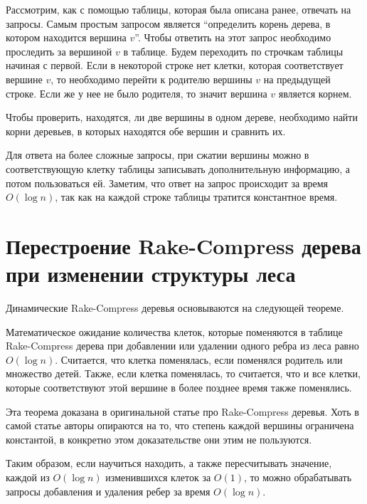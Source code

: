 Рассмотрим, как с помощью таблицы, которая была описана ранее, отвечать на запросы. Самым простым запросом является ``определить корень дерева, в котором находится вершина $v$''.
Чтобы ответить на этот запрос необходимо проследить за вершиной $v$ в таблице. Будем переходить по строчкам таблицы начиная с первой. Если в некоторой строке нет клетки,
которая соответствует вершине $v$, то необходимо перейти к родителю вершины $v$ на предыдущей строке. Если же у нее не было родителя, то значит вершина $v$ является корнем.

Чтобы проверить, находятся, ли две вершины в одном дереве, необходимо найти корни деревьев, в которых находятся обе вершин и сравнить их.

Для ответа на более сложные запросы, при сжатии вершины можно в соответствующую клетку таблицы записывать дополнительную информацию, а потом пользоваться ей. 
Заметим, что ответ на запрос происходит за время $O(\log n)$, так как на каждой строке таблицы тратится константное время.


\FloatBarrier
\section{Перестроение Rake-Compress дерева при изменении структуры леса}

Динамические Rake-Compress деревья основываются на следующей теореме.                                          

\begin{theorem}
Математическое ожидание количества клеток, которые поменяются в таблице Rake-Compress дерева при добавлении или удалении одного ребра из леса равно $O(\log n)$. 
Считается, что клетка поменялась, если поменялся родитель или множество детей.
Также, если клетка поменялась, то считается, что и все клетки, которые соответствуют этой вершине в более позднее время также поменялись.
\end{theorem}

Эта теорема доказана в оригинальной статье про Rake-Compress деревья. 
Хоть в самой статье авторы опираются на то, что степень каждой вершины ограничена константой, в конкретно этом доказательстве они этим не пользуются.

Таким образом, если научиться находить, а также пересчитывать значение, каждой из $O(\log n)$ изменившихся клеток за $O(1)$, то можно обрабатывать запросы добавления и удаления ребер за время $O(\log n)$.

\FloatBarrier
